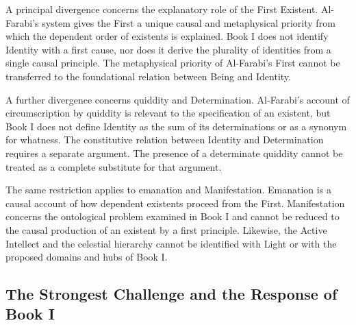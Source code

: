 \label{para:VS.B01.P01.C08.S12.SS13.P004}

A principal divergence concerns
the explanatory role of
the First Existent. Al-Farabi's
system gives the First a
unique causal and metaphysical
priority from which the
dependent order of existents
is explained. Book I does
not identify Identity with
a first cause, nor does
it derive the plurality
of identities from a single
causal principle. The
metaphysical priority of
Al-Farabi's First cannot
be transferred to the
foundational relation between
Being and Identity.

\label{para:VS.B01.P01.C08.S12.SS13.P005}

A further divergence concerns
quiddity and Determination.
Al-Farabi's account of
circumscription by quiddity
is relevant to the specification
of an existent, but Book I
does not define Identity
as the sum of its determinations
or as a synonym for whatness.
The constitutive relation
between Identity and
Determination requires
a separate argument. The
presence of a determinate
quiddity cannot be treated
as a complete substitute
for that argument.

\label{para:VS.B01.P01.C08.S12.SS13.P006}

The same restriction applies
to emanation and Manifestation.
Emanation is a causal account
of how dependent existents
proceed from the First.
Manifestation concerns
the ontological problem
examined in Book I and
cannot be reduced to the
causal production of an
existent by a first principle.
Likewise, the Active Intellect
and the celestial hierarchy
cannot be identified with
Light or with the proposed
domains and hubs of Book I.



\subsection{The Strongest Challenge and the Response of Book I}
\label{subsec:ch08-farabi-strongest-challenge}

\label{para:VS.B01.P01.C08.S12.SS14.P001}

